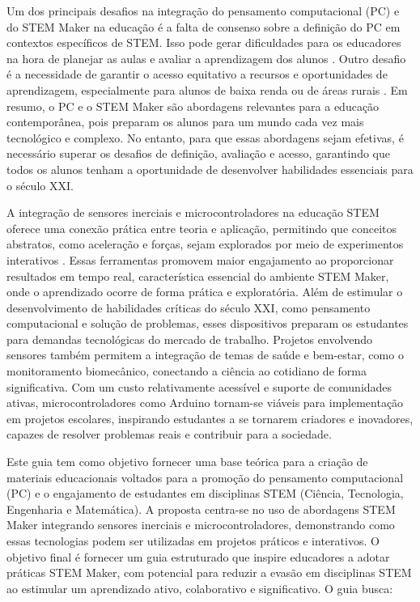 \documentclass[manuscript,screen,review]{acmart}
\begin{document}
Um dos principais desafios na integração do pensamento computacional (PC) e do STEM Maker na educação é a falta de consenso sobre a definição do PC em contextos específicos de STEM. Isso pode gerar dificuldades para os educadores na hora de planejar as aulas e avaliar a aprendizagem dos alunos \cite{Assessing,Integrating}. Outro desafio é a necessidade de garantir o acesso equitativo a recursos e oportunidades de aprendizagem, especialmente para alunos de baixa renda ou de áreas rurais \cite{Assessing}. Em resumo, o PC e o STEM Maker são abordagens relevantes para a educação contemporânea, pois preparam os alunos para um mundo cada vez mais tecnológico e complexo. No entanto, para que essas abordagens sejam efetivas, é necessário superar os desafios de definição, avaliação e acesso, garantindo que todos os alunos tenham a oportunidade de desenvolver habilidades essenciais para o século XXI.

A integração de sensores inerciais e microcontroladores na educação STEM oferece uma conexão prática entre teoria e aplicação, permitindo que conceitos abstratos, como aceleração e forças, sejam explorados por meio de experimentos interativos \cite{Measurement}. Essas ferramentas promovem maior engajamento ao proporcionar resultados em tempo real, característica essencial do ambiente STEM Maker, onde o aprendizado ocorre de forma prática e exploratória. Além de estimular o desenvolvimento de habilidades críticas do século XXI, como pensamento computacional e solução de problemas, esses dispositivos preparam os estudantes para demandas tecnológicas do mercado de trabalho. Projetos envolvendo sensores também permitem a integração de temas de saúde e bem-estar, como o monitoramento biomecânico, conectando a ciência ao cotidiano de forma significativa. Com um custo relativamente acessível e suporte de comunidades ativas, microcontroladores como Arduino tornam-se viáveis para implementação em projetos escolares, inspirando estudantes a se tornarem criadores e inovadores, capazes de resolver problemas reais e contribuir para a sociedade. 

Este guia tem como objetivo fornecer uma base teórica para a criação de materiais educacionais voltados para a promoção do pensamento computacional (PC) e o engajamento de estudantes em disciplinas STEM (Ciência, Tecnologia, Engenharia e Matemática). A proposta centra-se no uso de abordagens STEM Maker integrando sensores inerciais e microcontroladores, demonstrando como essas tecnologias podem ser utilizadas em projetos práticos e interativos. O objetivo final é fornecer um guia estruturado que inspire educadores a adotar práticas STEM Maker, com potencial para reduzir a evasão em disciplinas STEM ao estimular um aprendizado ativo, colaborativo e significativo. O guia busca:
\end{document}
